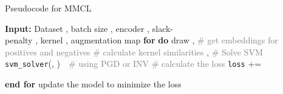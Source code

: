 \documentclass[letterpaper]{article} \usepackage{aaai22}  \usepackage{times}  \usepackage{helvet}  \usepackage{courier}  \usepackage[hyphens]{url}  \usepackage{graphicx} \urlstyle{rm} \def\UrlFont{\rm}  \usepackage{natbib}  \usepackage{caption} \DeclareCaptionStyle{ruled}{labelfont=normalfont,labelsep=colon,strut=off} \frenchspacing  \setlength{\pdfpagewidth}{8.5in}  \setlength{\pdfpageheight}{11in}
\begin{document}
\begin{algorithm}[!t]
\caption{\label{alg:mmcl} Pseudocode for MMCL}
\begin{algorithmic}
    \STATE \textbf{Input:} Dataset , batch size , encoder , slack- \\penalty , kernel , augmentation map 
    \STATE 
    \STATE \textbf{for}  \textbf{do}
        \STATE draw , 
        \STATE \textcolor{gray}{\# get embeddings for positives and negatives}
        \STATE 
        \STATE 
        \STATE \textcolor{gray}{\# calculate kernel similarities}
        \STATE , 
        \STATE \textcolor{gray}{\# Solve SVM}
        \STATE 
        \STATE  \texttt{svm\_solver}(, )~~\textcolor{gray} {\# using PGD or INV}
        \STATE \textcolor{gray}{\# calculate the loss}
        \STATE \texttt{loss} += 
        
    \STATE \textbf{end for}
    \STATE update the model to minimize the loss
    \ENDFOR
\end{algorithmic}
\end{algorithm}
\end{document}
